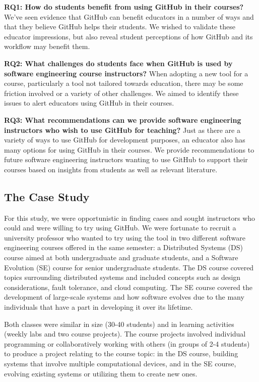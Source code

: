 \textbf{RQ1: How do students benefit from using GitHub in their courses?} We've seen evidence that GitHub can benefit educators in a number of ways \cite{zagalsky2015emergence} and that they believe GitHub helps their students. We wished to validate these educator impressions, but also reveal student perceptions of how GitHub and its workflow may benefit them.

\textbf{RQ2: What challenges do students face when GitHub is used by software engineering course instructors?} When adopting a new tool for a course, particularly a tool not tailored towards education, there may be some friction involved or a variety of other challenges. We aimed to identify these issues to alert educators using GitHub in their courses.

\textbf{RQ3: What recommendations can we provide software engineering instructors who wish to use GitHub for teaching?} Just as there are a variety of ways to use GitHub for development purposes, an educator also has many options for using GitHub in their courses. We provide recommendations to future software engineering instructors wanting to use GitHub to support their courses based on insights from students as well as relevant literature.

\subsection{The Case Study}
For this study, we were opportunistic in finding cases and sought instructors who could and were willing to try using GitHub. We were fortunate to recruit a university professor who wanted to try using the tool in two different software engineering courses offered in the same semester: a Distributed Systems (DS) course aimed at both undergraduate and graduate students, and a Software Evolution (SE) course for senior undergraduate students. The DS course covered topics surrounding distributed systems and included concepts such as design considerations, fault tolerance, and cloud computing. The SE course covered the development of large-scale systems and how software evolves due to the many individuals that have a part in developing it over its lifetime.

Both classes were similar in size (30-40 students) and in learning activities (weekly labs and two course projects). The course projects involved individual programming or collaboratively working with others (in groups of 2-4 students) to produce a project relating to the course topic: in the DS course, building systems that involve multiple computational devices, and in the SE course, evolving existing systems or utilizing them to create new ones.

